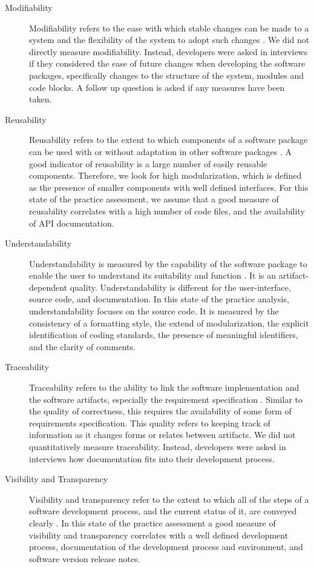 \documentclass[final, 3p, times, authoryear]{elsarticle}
\begin{document}
\begin{description}
	\item[Modifiability] Modifiability refers to the ease with which stable
	changes can be made to a system and the flexibility of the system to adopt
	such changes \citep{8016712}. We did not directly measure modifiability.
	Instead, developers were asked in interviews if they considered the ease of
	future changes when developing the software packages, specifically changes
	to the structure of the system, modules and code blocks. A follow up
	question is asked if any measures have been taken.
	
	\item[Reusability] Reusability refers to the extent to which components of a
	software package can be used with or without adaptation in other software
	packages \citep{kalagiakos2003non}. A good indicator of reusability is a
	large number of easily reusable components. Therefore, we look for high
	modularization, which is defined as the presence of smaller components with
	well defined interfaces. For this state of the practice assessment, we
	assume that a good measure of reusability correlates with a high
	number of code files, and the availability of API documentation.
	
	\item[Understandability] Understandability is measured by the capability of
	the software package to enable the user to understand its suitability and
	function \citep{ISO9126}. It is an artifact-dependent quality.
	Understandability is different for the user-interface, source code, and
	documentation. In this state of the practice analysis, understandability
	focuses on the source code. It is measured by the consistency of a
	formatting style, the extend of modularization, the explicit identification
	of coding standards, the presence of meaningful identifiers, and the clarity
	of comments. 
	
	\item[Traceability] Traceability refers to the ability to link the software
	implementation and the software artifacts, especially the requirement
	specification \citep{McCallEtAl1977}. Similar to the quality of correctness,
	this requires the availability of some form of requirements specification.
	This quality refers to keeping track of information as it changes forms or
	relates between artifacts. We did not quantitatively measure traceability.
	Instead, developers were asked in interviews how documentation fits into
	their development process.
	
	\item[Visibility and Transparency] Visibility and transparency refer to the
	extent to which all of the steps of a software development process, and the
	current status of it, are conveyed clearly \citep[p.\ 32]{GhezziEtAl2003}.
	In this state of the practice assessment a good measure of visibility and
	transparency correlates with a well defined development process,
	documentation of the development process and environment, and software
	version release notes.
	

\end{description}
\end{document}
